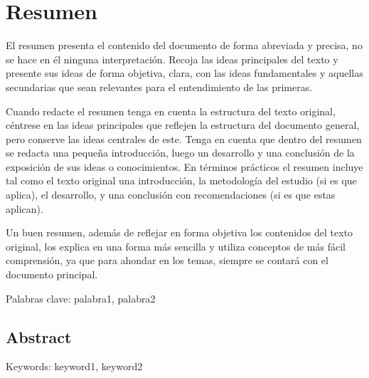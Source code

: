 \cleardoublepage
\chapter*{Resumen}

El resumen presenta el contenido del documento de forma abreviada y precisa,
no se hace en él ninguna interpretación. Recoja las ideas principales del texto
y presente sus ideas de forma objetiva, clara, con las ideas fundamentales y
aquellas secundarias que sean relevantes para el entendimiento de las
primeras.

Cuando redacte el resumen tenga en cuenta la estructura del texto original,
céntrese en las ideas principales que reflejen la estructura del documento
general, pero conserve las ideas centrales de este. Tenga en cuenta que dentro
del resumen se redacta una pequeña introducción, luego un desarrollo y una
conclusión de la exposición de sus ideas o conocimientos. En términos prácticos
el resumen incluye tal como el texto original una introducción, la metodología
del estudio (si es que aplica), el desarrollo, y una conclusión con
recomendaciones (si es que estas aplican).

Un buen resumen, además de reflejar en forma objetiva los contenidos del
texto original, los explica en una forma más sencilla y utiliza conceptos de más
fácil comprensión, ya que para ahondar en los temas, siempre se contará con
el documento principal.

\vskip0.5cm

Palabras clave: palabra1, palabra2

\begin{otherlanguage}{english}
    \cleardoublepage
    \chapter*{Abstract}
    \lipsum[1-2]
    \vskip0.5cm
    Keywords: keyword1, keyword2
\end{otherlanguage}
